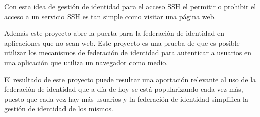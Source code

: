Con esta idea de gestión de identidad para el acceso SSH el permitir o
prohibir el acceso a un servicio SSH es tan simple como visitar una página
web.

Además este proyecto abre la puerta para la federación de identidad en
aplicaciones que no sean web. Este proyecto es una prueba de que es posible
utilizar los mecanismos de federación de identidad para autenticar a
usuarios en una aplicación que utiliza un navegador como medio.

El resultado de este proyecto puede resultar una aportación relevante
al uso de la federación de identidad que a día de hoy se está
popularizando cada vez más, puesto que cada vez hay más usuarios y
la federación de identidad simplifica la gestión de identidad de los
mismos.
